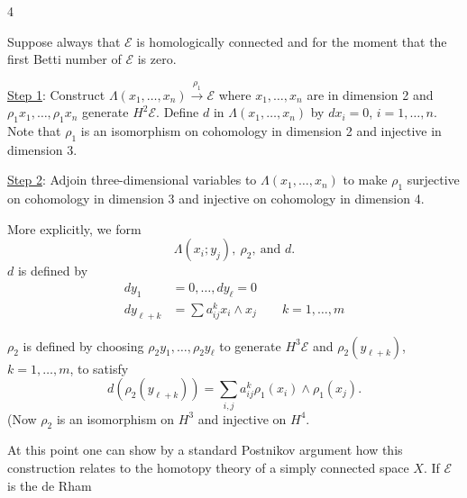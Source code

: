 \begin{flushright}4\end{flushright}

Suppose always that $\mathcal E$ is homologically connected and for the moment that the first Betti number of $\mathcal E$ is zero.

\uline{Step 1}: Construct $\Lambda(x_1,\ldots,x_n)\xrightarrow{\rho_1}\mathcal E$ where $x_1,\ldots,x_n$ are in dimension 2 and $\rho_1x_1,\ldots,\rho_1x_n$ generate $H^2\mathcal E$.
Define $d$ in $\Lambda(x_1,\ldots,x_n)$ by $dx_i=0$, $i=1,\ldots,n$.
Note that $\rho_1$ is an isomorphism on cohomology in dimension 2 and injective in dimension 3.

\uline{Step 2}: Adjoin three-dimensional variables to $\Lambda(x_1,\ldots,x_n)$ to make $\rho_1$ surjective on cohomology in dimension 3 and injective on cohomology in dimension 4.

More explicitly, we form
\[
\Lambda(x_i;y_j),\ \rho_2,\ \text{and }d.
\]
$d$ is defined by
\[
\begin{aligned}
dy_1&=0,\ldots,dy_\ell=0\\
dy_{\ell+k}&=\sum a^k_{ij}x_i\wedge x_j
\qquad k=1,\ldots,m
\end{aligned}
\]

$\rho_2$ is defined by choosing $\rho_2y_1,\ldots,\rho_2y_\ell$ to generate $H^3\mathcal E$ and $\rho_2(y_{\ell+k})$, $k=1,\ldots,m$, to satisfy
\[
d(\rho_2(y_{\ell+k}))=\sum_{i,j}a^k_{ij}\rho_1(x_i)\wedge\rho_1(x_j).
\]
(Now $\rho_2$ is an isomorphism on $H^3$ and injective on $H^4$.

At this point one can show by a standard Postnikov argument how this construction relates to the homotopy theory of a simply connected space $X$. If $\mathcal E$ is the de Rham
